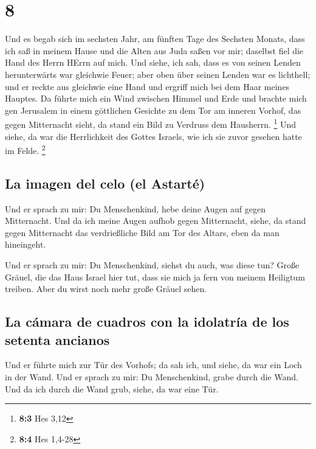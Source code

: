 \hypertarget{section-7}{%
\section{8}\label{section-7}}

 Und es begab sich im sechsten Jahr, am fünften Tage des
Sechsten Monats, dass ich saß in meinem Hause und die Alten aus Juda
saßen vor mir; daselbst fiel die Hand des Herrn HErrn auf mich.
 Und siehe, ich sah, dass es von seinen Lenden
herunterwärts war gleichwie Feuer; aber oben über seinen Lenden war es
lichthell;  und er reckte aus gleichwie eine Hand und
ergriff mich bei dem Haar meines Hauptes. Da führte mich ein Wind
zwischen Himmel und Erde und brachte mich gen Jerusalem in einem
göttlichen Gesichte zu dem Tor am inneren Vorhof, das gegen Mitternacht
sieht, da stand ein Bild zu Verdruss dem Hausherrn. \footnote{\textbf{8:3}
  Hes 3,12}  Und siehe, da war die Herrlichkeit des Gottes
Israels, wie ich sie zuvor gesehen hatte im Felde. \footnote{\textbf{8:4}
  Hes 1,4-28}

\hypertarget{la-imagen-del-celo-el-astartuxe9}{%
\subsection{La imagen del celo (el
Astarté)}\label{la-imagen-del-celo-el-astartuxe9}}

 Und er sprach zu mir: Du Menschenkind, hebe deine Augen
auf gegen Mitternacht. Und da ich meine Augen aufhob gegen Mitternacht,
siehe, da stand gegen Mitternacht das verdrießliche Bild am Tor des
Altars, eben da man hineingeht.

 Und er sprach zu mir: Du Menschenkind, siehst du auch,
was diese tun? Große Gräuel, die das Haus Israel hier tut, dass sie mich
ja fern von meinem Heiligtum treiben. Aber du wirst noch mehr große
Gräuel sehen.

\hypertarget{la-cuxe1mara-de-cuadros-con-la-idolatruxeda-de-los-setenta-ancianos}{%
\subsection{La cámara de cuadros con la idolatría de los setenta
ancianos}\label{la-cuxe1mara-de-cuadros-con-la-idolatruxeda-de-los-setenta-ancianos}}

 Und er führte mich zur Tür des Vorhofs; da sah ich, und
siehe, da war ein Loch in der Wand.  Und er sprach zu mir:
Du Menschenkind, grabe durch die Wand. Und da ich durch die Wand grub,
siehe, da war eine Tür.

